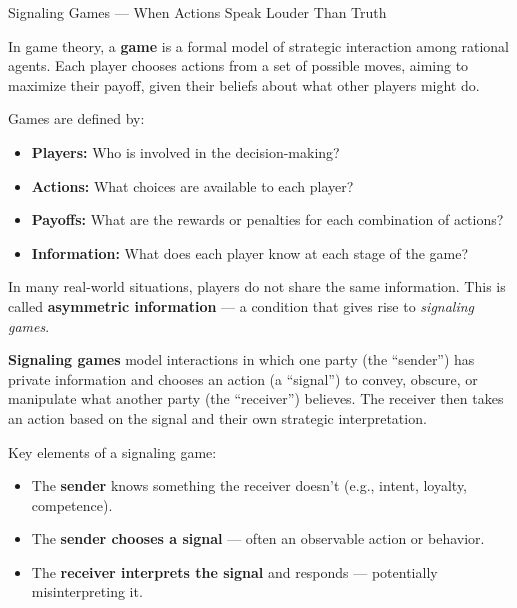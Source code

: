\medskip

\begin{TechnicalSidebar}{Signaling Games --- When Actions Speak Louder Than Truth}

    In game theory, a \textbf{game} is a formal model of strategic interaction among rational agents. 
    Each player chooses actions from a set of possible moves, aiming to maximize their payoff, 
    given their beliefs about what other players might do.

    \medskip
    
    Games are defined by:

    \medskip

    \begin{itemize}
      \item \textbf{Players:} Who is involved in the decision-making?
      \item \textbf{Actions:} What choices are available to each player?
      \item \textbf{Payoffs:} What are the rewards or penalties for each combination of actions?
      \item \textbf{Information:} What does each player know at each stage of the game?
    \end{itemize}

    \medskip
    
    In many real-world situations, players do not share the same information. 
    This is called \textbf{asymmetric information} — a condition that gives rise to 
    \emph{signaling games}.
    
    \medskip
    
    \textbf{Signaling games} model interactions in which one party (the ``sender'') has private 
    information and chooses an action (a ``signal'') to convey, obscure, or manipulate what 
    another party (the ``receiver'') believes. The receiver then takes an action based on the 
    signal and their own strategic interpretation.
    
    \medskip
    
    Key elements of a signaling game:

    \medskip

    \begin{itemize}
      \item The \textbf{sender} knows something the receiver doesn't (e.g., intent, loyalty, competence).
      \item The \textbf{sender chooses a signal} — often an observable action or behavior.
      \item The \textbf{receiver interprets the signal} and responds — potentially misinterpreting it.
    \end{itemize}


\end{TechnicalSidebar}
